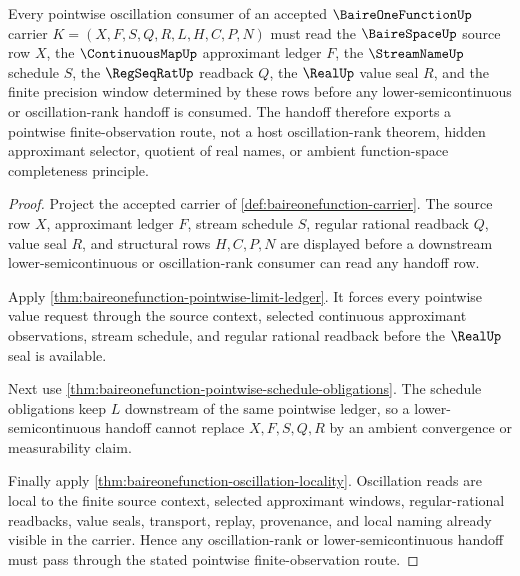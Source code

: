 \begin{theorem}
\label{thm:baire-one-function-pointwise-oscillation-handoff}
Every pointwise oscillation consumer of an accepted $\BaireOneFunctionUp$ carrier $K=(X,F,S,Q,R,L,H,C,P,N)$ must read the $\BaireSpaceUp$ source row $X$, the $\ContinuousMapUp$ approximant ledger $F$, the $\StreamNameUp$ schedule $S$, the $\RegSeqRatUp$ readback $Q$, the $\RealUp$ value seal $R$, and the finite precision window determined by these rows before any lower-semicontinuous or oscillation-rank handoff is consumed. The handoff therefore exports a pointwise finite-observation route, not a host oscillation-rank theorem, hidden approximant selector, quotient of real names, or ambient function-space completeness principle.
\end{theorem}
\begin{proof}
Project the accepted carrier of \autoref{def:baireonefunction-carrier}. The source row $X$, approximant ledger $F$, stream schedule $S$, regular rational readback $Q$, value seal $R$, and structural rows $H,C,P,N$ are displayed before a downstream lower-semicontinuous or oscillation-rank consumer can read any handoff row.

Apply \autoref{thm:baireonefunction-pointwise-limit-ledger}. It forces every pointwise value request through the source context, selected continuous approximant observations, stream schedule, and regular rational readback before the $\RealUp$ seal is available.

Next use \autoref{thm:baireonefunction-pointwise-schedule-obligations}. The schedule obligations keep $L$ downstream of the same pointwise ledger, so a lower-semicontinuous handoff cannot replace $X,F,S,Q,R$ by an ambient convergence or measurability claim.

Finally apply \autoref{thm:baireonefunction-oscillation-locality}. Oscillation reads are local to the finite source context, selected approximant windows, regular-rational readbacks, value seals, transport, replay, provenance, and local naming already visible in the carrier. Hence any oscillation-rank or lower-semicontinuous handoff must pass through the stated pointwise finite-observation route.
\end{proof}


